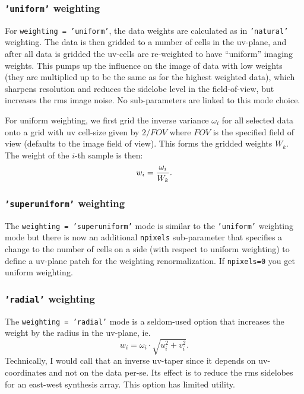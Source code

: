 \subsubsection{{\tt 'uniform'} weighting }
\label{section:im.pars.weighting.uniform}

For {\tt weighting = 'uniform'}, the data weights are calculated
as in {\tt 'natural'} weighting.  The data is then gridded to
a number of cells in the uv-plane, and after all data is gridded
the uv-cells are re-weighted to have ``uniform'' imaging weights.
This pumps
up the influence on the image of data with low weights (they are
multiplied up to be the same as for the highest weighted data), which
sharpens resolution and reduces the sidelobe level in the
field-of-view, but increases the rms image noise. No sub-parameters are
linked to this mode choice.

For uniform weighting, we first grid the inverse variance $\omega_i$
for all selected data onto a grid with uv cell-size given by $2/FOV$
where $FOV$ is the specified field of view (defaults to the image
field of view).  This forms the gridded weights $W_k$. The weight of
the $i$-th sample is then: 
\begin{equation}
  w_i = {\omega_i \over W_k}.
\end{equation}

\subsubsection{{\tt 'superuniform'} weighting }
\label{section:im.pars.weighting.superuniform}

The {\tt weighting = 'superuniform'} mode is similar to the
{\tt 'uniform'} weighting mode but there is now an additional
{\tt npixels} sub-parameter that specifies a change to the number of 
cells on a side (with respect to uniform weighting) to define a
uv-plane patch for the weighting renormalization.  
If {\tt npixels=0} you get uniform weighting.

\subsubsection{{\tt 'radial'} weighting }
\label{section:im.pars.weighting.radial}

The {\tt weighting = 'radial'} mode is a seldom-used option that
increases the weight by the radius in the uv-plane, ie.
\begin{equation}
  w_i = \omega_i \cdot \sqrt{u^2_i + v^2_i}.
\end{equation}
Technically, I would call that an inverse uv-taper since it depends on
uv-coordinates and not on the data per-se.
Its effect is to reduce the rms sidelobes for an east-west synthesis
array.  This option has limited utility.

